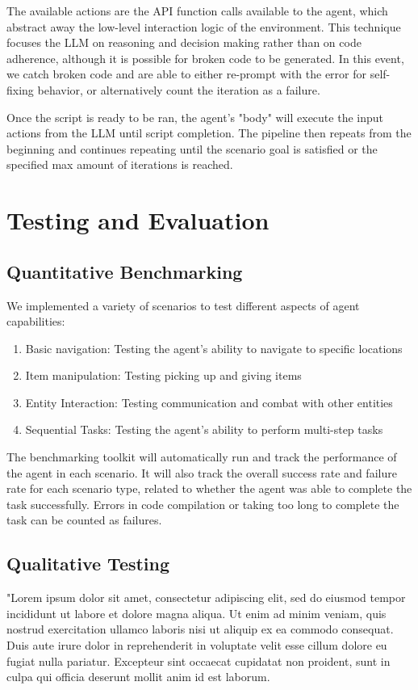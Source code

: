 \documentclass{article}
\begin{document}
The available actions are the API function calls available to the agent, which abstract away the low-level interaction logic of the environment.
This technique focuses the LLM on reasoning and decision making rather than on code adherence, although it is possible for broken code to be generated.
In this event, we catch broken code and are able to either re-prompt with the error for self-fixing behavior, or alternatively count the iteration as a failure.

Once the script is ready to be ran, the agent's "body" will execute the input actions from the LLM until script completion.
The pipeline then repeats from the beginning and continues repeating until the scenario goal is satisfied or the specified max amount of iterations is reached.

\section{Testing and Evaluation}
\subsection{Quantitative Benchmarking}
We implemented a variety of scenarios to test different aspects of agent capabilities:
\begin{enumerate}
    \item Basic navigation: Testing the agent's ability to navigate to specific locations
    \item Item manipulation: Testing picking up and giving items
    \item Entity Interaction: Testing communication and combat with other entities
    \item Sequential Tasks: Testing the agent's ability to perform multi-step tasks
\end{enumerate}
The benchmarking toolkit will automatically run and track the performance of the agent in each scenario.
It will also track the overall success rate and failure rate for each scenario type, related to whether the agent was able to complete the task successfully. Errors in code compilation or taking too long to complete the task can be counted as failures.
\subsection{Qualitative Testing}
"Lorem ipsum dolor sit amet, consectetur adipiscing elit, sed do eiusmod tempor incididunt ut labore et dolore magna aliqua. Ut enim ad minim veniam, quis nostrud exercitation ullamco laboris nisi ut aliquip ex ea commodo consequat. Duis aute irure dolor in reprehenderit in voluptate velit esse cillum dolore eu fugiat nulla pariatur. Excepteur sint occaecat cupidatat non proident, sunt in culpa qui officia deserunt mollit anim id est laborum.
\end{document}
